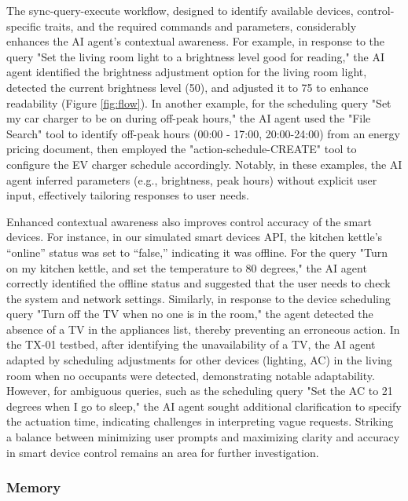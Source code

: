 \documentclass[final,3p,times]{elsarticle}
\begin{document}
The sync-query-execute workflow, designed to identify available devices, control-specific traits, and the required commands and parameters, considerably enhances the AI agent’s contextual awareness. For example, in response to the query "Set the living room light to a brightness level good for reading," the AI agent identified the brightness adjustment option for the living room light, detected the current brightness level (50), and adjusted it to 75 to enhance readability (Figure \ref{fig:flow}). In another example, for the scheduling query "Set my car charger to be on during off-peak hours," the AI agent used the "File Search" tool to identify off-peak hours (00:00 - 17:00, 20:00-24:00) from an energy pricing document, then employed the "action-schedule-CREATE" tool to configure the EV charger schedule accordingly. Notably, in these examples, the AI agent inferred parameters (e.g., brightness, peak hours) without explicit user input, effectively tailoring responses to user needs.

Enhanced contextual awareness also improves control accuracy of the smart devices. For instance, in our simulated smart devices API, the kitchen kettle’s “online” status was set to “false,” indicating it was offline. For the query "Turn on my kitchen kettle, and set the temperature to 80 degrees," the AI agent correctly identified the offline status and suggested that the user needs to check the system and network settings. Similarly, in response to the device scheduling query "Turn off the TV when no one is in the room," the agent detected the absence of a TV in the appliances list, thereby preventing an erroneous action. In the TX-01 testbed, after identifying the unavailability of a TV, the AI agent adapted by scheduling adjustments for other devices (lighting, AC) in the living room when no occupants were detected, demonstrating notable adaptability. However, for ambiguous queries, such as the scheduling query "Set the AC to 21 degrees when I go to sleep," the AI agent sought additional clarification to specify the actuation time, indicating challenges in interpreting vague requests. Striking a balance between minimizing user prompts and maximizing clarity and accuracy in smart device control remains an area for further investigation.

\subsubsection{Memory}
\end{document}
